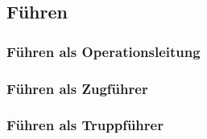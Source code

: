 \subsection{Führen}
\subsubsection{Führen als Operationsleitung}
\subsubsection{Führen als Zugführer}
\subsubsection{Führen als Truppführer}